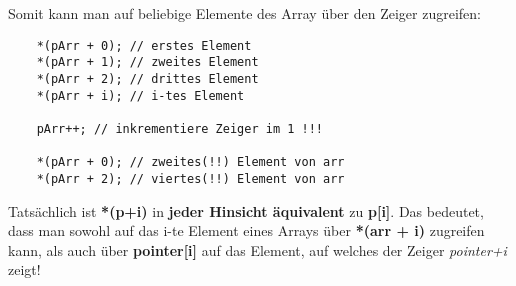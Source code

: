 \documentclass[
  accentcolor=tud1c,	%
  colorbacktitle,		%
  inverttitle,			%
  german,				%
  twoside
]{tudexercise}
\begin{document}
Somit kann man auf beliebige Elemente des Array über den Zeiger zugreifen:
\begin{lstlisting}
	*(pArr + 0); // erstes Element
	*(pArr + 1); // zweites Element
	*(pArr + 2); // drittes Element
	*(pArr + i); // i-tes Element
	
	pArr++; // inkrementiere Zeiger im 1 !!!
	
	*(pArr + 0); // zweites(!!) Element von arr
	*(pArr + 2); // viertes(!!) Element von arr
\end{lstlisting}

Tatsächlich ist \textbf{*(p+i)} in \textbf{jeder Hinsicht äquivalent} zu \textbf{p[i]}. Das bedeutet, dass man sowohl auf das i-te Element eines Arrays über \textbf{*(arr + i)} zugreifen kann, als auch über \textbf{pointer[i]} auf das Element, auf welches der Zeiger \emph{pointer+i} zeigt!
\end{document}
